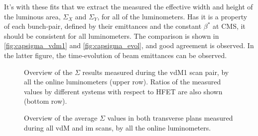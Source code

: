It's with these fits that we extract the measured the effective width and height of the luminous area, $\Sigma_X$ and $\Sigma_Y$, for all of the luminometers. Has it is a property of each bunch-pair, defined by their emittances and the constant $\beta^{*}$ at CMS, it should be consistent for all luminometers. The comparison is shown in \autoref{fig:capsigma_vdm1} and \autoref{fig:capsigma_evol}, and good agreement is observed. In the latter figure, the time-evolution of beam emittances can be observed.

\begin{figure}[!htb]
	\centering
	\caption[Overview of the measured effective beam overlap widths]{Overview of the $\Sigma$ results measured during the vdM1 scan pair, by all the online luminometers (upper row). Ratios of the measured values by different systems with respect to HFET are also shown (bottom row).}
	\label{fig:capsigma_vdm1}
\end{figure}

\begin{figure}[!htb]
	\centering
	\caption{Overview of the average $\Sigma$ values in both transverse plans measured during all vdM and im scans, by all the online luminometers.}
	\label{fig:capsigma_evol}
\end{figure}

